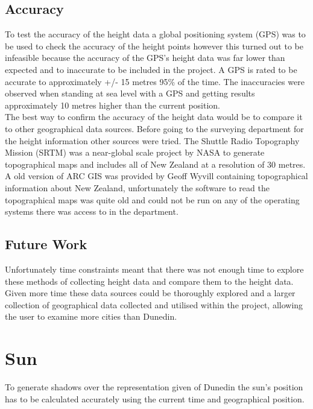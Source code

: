 \documentclass[12pt]{report}
\begin{document}
\subsection{Accuracy}
To test the accuracy of the height data a global positioning system (GPS) was to be used to check the accuracy of the height points however this turned out to be infeasible because the accuracy of the GPS's height data was far lower than expected and to inaccurate to be included in the project. A GPS is rated to be accurate to approximately +/- 15 metres 95\% of the time\cite{gpsaltitude}. The inaccuracies were observed when standing at sea level with a GPS and getting results approximately 10 metres higher than the current position.\\

The best way to confirm the accuracy of the height data would be to compare it to other geographical data sources. Before going to the surveying department for the height information other sources were tried. The Shuttle Radio Topography Mission (SRTM)\cite{srtm} was a near-global scale project by NASA to generate topographical maps and includes all of New Zealand at a resolution of 30 metres. A old version of ARC GIS was provided by Geoff Wyvill containing topographical information about New Zealand, unfortunately the software to read the topographical maps was quite old and could not be run on any of the operating systems there was access to in the department.\\

\subsection{Future Work}
Unfortunately time constraints meant that there was not enough time to explore these methods of collecting height data and compare them to the height data.
 Given more time these data sources could be thoroughly explored and a larger collection of geographical data collected and utilised within the project, allowing the user to examine more cities than Dunedin.\\

\section{Sun}
To generate shadows over the representation given of Dunedin the sun's position has to be calculated accurately using the current time and geographical position.\\
\end{document}
